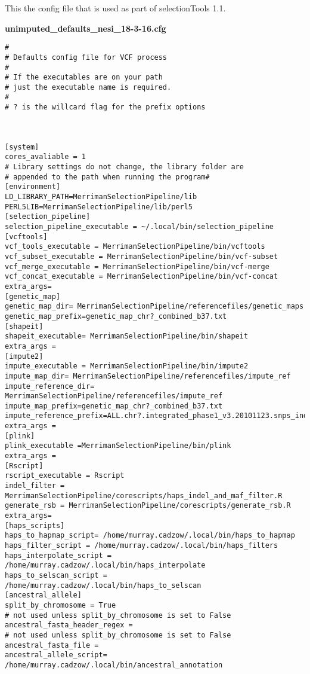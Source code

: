 \documentclass[]{report}
\begin{document}
\begin{appendices}
This the config file that is used as part of selectionTools 1.1.

\textbf{unimputed\_defaults\_nesi\_18-3-16.cfg}

\begin{verbatim}
#
# Defaults config file for VCF process
#
# If the executables are on your path 
# just the executable name is required.
#
# ? is the willcard flag for the prefix options



[system]
cores_avaliable = 1
# Library settings do not change, the library folder are 
# appended to the path when running the program#
[environment]
LD_LIBRARY_PATH=MerrimanSelectionPipeline/lib
PERL5LIB=MerrimanSelectionPipeline/lib/perl5
[selection_pipeline]
selection_pipeline_executable = ~/.local/bin/selection_pipeline
[vcftools]
vcf_tools_executable = MerrimanSelectionPipeline/bin/vcftools
vcf_subset_executable = MerrimanSelectionPipeline/bin/vcf-subset
vcf_merge_executable = MerrimanSelectionPipeline/bin/vcf-merge
vcf_concat_executable = MerrimanSelectionPipeline/bin/vcf-concat
extra_args= 
[genetic_map]
genetic_map_dir= MerrimanSelectionPipeline/referencefiles/genetic_maps
genetic_map_prefix=genetic_map_chr?_combined_b37.txt
[shapeit]
shapeit_executable= MerrimanSelectionPipeline/bin/shapeit
extra_args =
[impute2]
impute_executable = MerrimanSelectionPipeline/bin/impute2
impute_map_dir= MerrimanSelectionPipeline/referencefiles/impute_ref
impute_reference_dir= MerrimanSelectionPipeline/referencefiles/impute_ref
impute_map_prefix=genetic_map_chr?_combined_b37.txt
impute_reference_prefix=ALL.chr?.integrated_phase1_v3.20101123.snps_indels_svs.genotypes.nomono
extra_args = 
[plink]
plink_executable =MerrimanSelectionPipeline/bin/plink
extra_args = 
[Rscript]
rscript_executable = Rscript
indel_filter = MerrimanSelectionPipeline/corescripts/haps_indel_and_maf_filter.R
generate_rsb = MerrimanSelectionPipeline/corescripts/generate_rsb.R
extra_args=
[haps_scripts]
haps_to_hapmap_script= /home/murray.cadzow/.local/bin/haps_to_hapmap
haps_filter_script = /home/murray.cadzow/.local/bin/haps_filters
haps_interpolate_script = /home/murray.cadzow/.local/bin/haps_interpolate
haps_to_selscan_script = /home/murray.cadzow/.local/bin/haps_to_selscan
[ancestral_allele]
split_by_chromosome = True
# not used unless split_by_chromosome is set to False
ancestral_fasta_header_regex = 
# not used unless split_by_chromosome is set to False
ancestral_fasta_file =
ancestral_allele_script= /home/murray.cadzow/.local/bin/ancestral_annotation


\end{verbatim}
\end{appendices}
\end{document}
